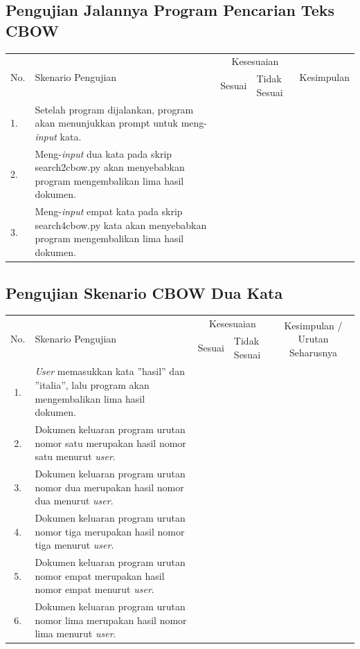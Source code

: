 \documentclass[12pt]{report}
\begin{document}
\subsection*{\thesubsection\quad Pengujian Jalannya Program Pencarian Teks CBOW}
\begin{center}
\begin{tabular}{ |l|    m{7cm}            |c|m{1cm}|c |  }
\hline
\multirow{2}{*}{No.} & \multirow{2}{7cm}{Skenario Pengujian} & \multicolumn{2}{c|}{Kesesuaian} &\multirow{2}{*}{Kesimpulan} \\\cline{3-4}
	&			& Sesuai	&	Tidak Sesuai   	&		\\
\hline
1.&Setelah program dijalankan, program akan menunjukkan prompt untuk meng-\textit{input} kata.&	&	& \\
\hline
2.&Meng-\textit{input} dua kata pada skrip search2cbow.py akan menyebabkan program mengembalikan lima hasil dokumen.&	&	& \\
\hline
3.&Meng-\textit{input} empat kata pada skrip search4cbow.py kata akan menyebabkan program mengembalikan lima hasil dokumen.&	&	& \\
\hline
\end{tabular}
\end{center}

\newpage
\subsection*{\thesubsection\quad Pengujian Skenario CBOW Dua Kata}
\begin{center}
\begin{tabular}{ |c|    m{6cm}         |c|m{1cm}| c |  }
\hline
\multirow{2}{*}{No.} & \multirow{2}{6cm}{Skenario Pengujian} & \multicolumn{2}{c|}{Kesesuaian} &\multirow{2}{2.3cm}{Kesimpulan / Urutan Seharusnya} \\\cline{3-4}
	&			& Sesuai	&	Tidak Sesuai   	&		\\
 \hline
1.&\textit{User} memasukkan kata ''hasil'' dan ''italia'', lalu program akan mengembalikan lima hasil dokumen.&	&	& \\
\hline
 2.&Dokumen keluaran program urutan nomor satu merupakan hasil nomor satu menurut \textit{user}.&	&	& \\
 \hline
 3.&Dokumen keluaran program urutan nomor dua merupakan hasil nomor dua menurut \textit{user}.&	&	& \\
 \hline
 4.&Dokumen keluaran program urutan nomor tiga merupakan hasil nomor tiga menurut \textit{user}.&	&	& \\
 \hline
5.&Dokumen keluaran program urutan nomor empat merupakan hasil nomor empat menurut \textit{user}.&	&	& \\
 \hline
6.&Dokumen keluaran program urutan nomor lima merupakan hasil nomor lima menurut \textit{user}.&	&	& \\
 \hline
\end{tabular}
  \end{center}
\end{document}
